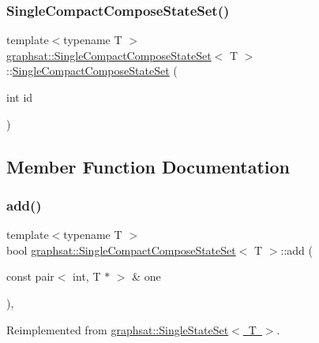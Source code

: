 \subsubsection{\texorpdfstring{SingleCompactComposeStateSet()}{SingleCompactComposeStateSet()}}
{\footnotesize\ttfamily template$<$typename T $>$ \\
\mbox{\hyperlink{classgraphsat_1_1_single_compact_compose_state_set}{graphsat\+::\+Single\+Compact\+Compose\+State\+Set}}$<$ T $>$\+::\mbox{\hyperlink{classgraphsat_1_1_single_compact_compose_state_set}{Single\+Compact\+Compose\+State\+Set}} (\begin{DoxyParamCaption}\item[{int}]{id }\end{DoxyParamCaption})\hspace{0.3cm}{\ttfamily [inline]}}



\subsection{Member Function Documentation}
\mbox{\label{classgraphsat_1_1_single_compact_compose_state_set_a7f5aa3bcf4d884372d99fe33402a4f0a}} 
\subsubsection{\texorpdfstring{add()}{add()}}
{\footnotesize\ttfamily template$<$typename T $>$ \\
bool \mbox{\hyperlink{classgraphsat_1_1_single_compact_compose_state_set}{graphsat\+::\+Single\+Compact\+Compose\+State\+Set}}$<$ T $>$\+::add (\begin{DoxyParamCaption}\item[{const pair$<$ int, T $\ast$ $>$ \&}]{one }\end{DoxyParamCaption})\hspace{0.3cm}{\ttfamily [inline]}, {\ttfamily [virtual]}}



Reimplemented from \mbox{\hyperlink{classgraphsat_1_1_single_state_set_a5fb0f789a7429ca9ad94003f4e639570}{graphsat\+::\+Single\+State\+Set$<$ T $>$}}.

